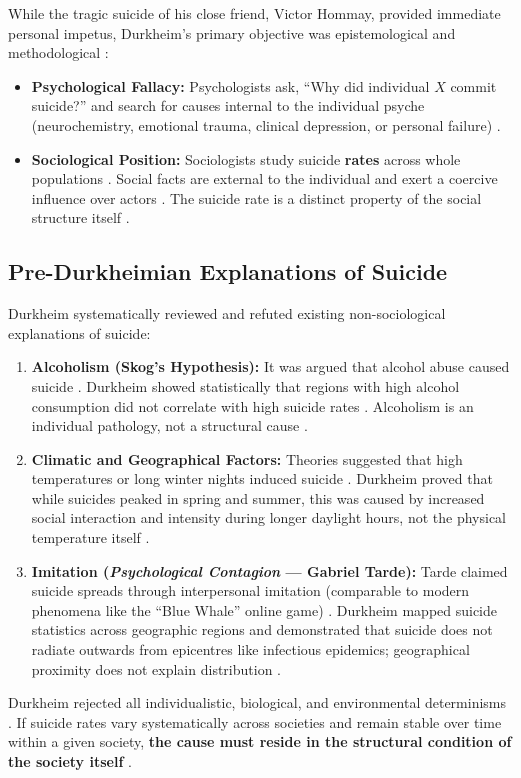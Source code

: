 While the tragic suicide of his close friend, Victor Hommay, provided immediate personal impetus, Durkheim's primary objective was epistemological and methodological :
\begin{itemize}
    \item \textbf{Psychological Fallacy:} Psychologists ask, ``Why did individual $X$ commit suicide?'' and search for causes internal to the individual psyche (neurochemistry, emotional trauma, clinical depression, or personal failure) .
    \item \textbf{Sociological Position:} Sociologists study suicide \textbf{rates} across whole populations . Social facts are external to the individual and exert a coercive influence over actors . The suicide rate is a distinct property of the social structure itself .
\end{itemize}

\subsection{Pre-Durkheimian Explanations of Suicide}

Durkheim systematically reviewed and refuted existing non-sociological explanations of suicide:
\begin{enumerate}
    \item \textbf{Alcoholism (Skog's Hypothesis):} It was argued that alcohol abuse caused suicide . Durkheim showed statistically that regions with high alcohol consumption did not correlate with high suicide rates . Alcoholism is an individual pathology, not a structural cause .
    \item \textbf{Climatic and Geographical Factors:} Theories suggested that high temperatures or long winter nights induced suicide . Durkheim proved that while suicides peaked in spring and summer, this was caused by increased social interaction and intensity during longer daylight hours, not the physical temperature itself .
    \item \textbf{Imitation (\textit{Psychological Contagion} --- Gabriel Tarde):} Tarde claimed suicide spreads through interpersonal imitation (comparable to modern phenomena like the ``Blue Whale'' online game) . Durkheim mapped suicide statistics across geographic regions and demonstrated that suicide does not radiate outwards from epicentres like infectious epidemics; geographical proximity does not explain distribution .
\end{enumerate}

\begin{CriticalPoint}
Durkheim rejected all individualistic, biological, and environmental determinisms . If suicide rates vary systematically across societies and remain stable over time within a given society, \textbf{the cause must reside in the structural condition of the society itself} .
\end{CriticalPoint}

